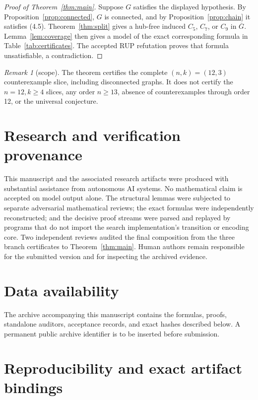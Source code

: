 \documentclass[11pt]{article}
\theoremstyle{definition}
\theoremstyle{remark}
\newtheorem{remark}[theorem]{Remark}
\begin{document}
\begin{proof}[Proof of Theorem~\ref{thm:main}]
Suppose \(G\) satisfies the displayed hypothesis.  By
Proposition~\ref{prop:connected}, \(G\) is connected, and by
Proposition~\ref{prop:chain} it satisfies (4.5).
Theorem~\ref{thm:split} gives a hub-free induced \(C_5\), \(C_7\), or
\(C_9\) in \(\overline G\).  Lemma~\ref{lem:coverage} then gives a model of
the exact corresponding formula in Table~\ref{tab:certificates}.  The
accepted RUP refutation proves that formula unsatisfiable, a contradiction.
\end{proof}

\begin{remark}[scope]
The theorem certifies the complete \((n,k)=(12,3)\) counterexample slice,
including disconnected graphs.  It does not certify the \(n=12,k\geq4\)
slices, any order \(n\geq13\), absence of counterexamples through order 12,
or the universal conjecture.
\end{remark}

\section{Research and verification provenance}

This manuscript and the associated research artifacts were produced with
substantial assistance from autonomous AI systems.  No mathematical claim
is accepted on model output alone.  The structural lemmas were subjected to
separate adversarial mathematical reviews; the exact formulas were
independently reconstructed; and the decisive proof streams were parsed and
replayed by programs that do not import the search implementation's
transition or encoding core.  Two independent reviews audited the final
composition from the three branch certificates to
Theorem~\ref{thm:main}.  Human authors remain responsible for the submitted
version and for inspecting the archived evidence.

\section*{Data availability}

The archive accompanying this manuscript contains the formulas, proofs,
standalone auditors, acceptance records, and exact hashes described below.
A permanent public archive identifier is to be inserted before submission.

\appendix

\section{Reproducibility and exact artifact bindings}\label{app:repro}
\end{document}

